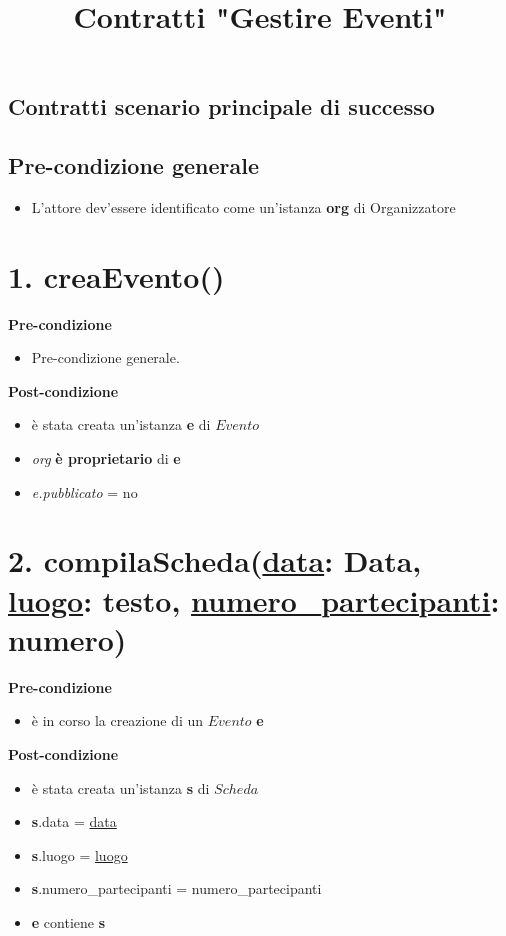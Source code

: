 \documentclass[12pt]{extarticle}
\begin{document}
\title{Contratti "Gestire Eventi"}
\date{}
\maketitle


\begin{center}
  \section*{Contratti scenario principale di successo}
\end{center}

\subsection*{Pre-condizione generale}

\begin{itemize}
  \item L'attore dev'essere identificato come un'istanza \textbf{org} di Organizzatore
\end{itemize}

\section*{1. creaEvento()}

\textbf{Pre-condizione}
\begin{itemize}
  \item Pre-condizione generale.
\end{itemize}
\textbf{Post-condizione}
\begin{itemize}
  \item è stata creata un'istanza \textbf{e} di $Evento$
  \item \textit{org} \textbf{è proprietario} di \textbf{e}
  \item \textit{e.pubblicato} = no
\end{itemize}


\section*{2. compilaScheda(\underline{data}: Data, \underline{luogo}: testo, \underline{numero\_partecipanti}: numero)}

\textbf{Pre-condizione}
\begin{itemize}
  \item è in corso la creazione di un $Evento$ \textbf{e}
\end{itemize} 
\textbf{Post-condizione} 
\begin{itemize}
  \item è stata creata un'istanza \textbf{s} di $Scheda$
  \item \textbf{s}.data = \underline{data} 
  \item \textbf{s}.luogo = \underline{luogo} 
  \item \textbf{s}.numero\_partecipanti = numero\_partecipanti
  \item \textbf{e} contiene \textbf{s}
\end{itemize}
\end{document}
